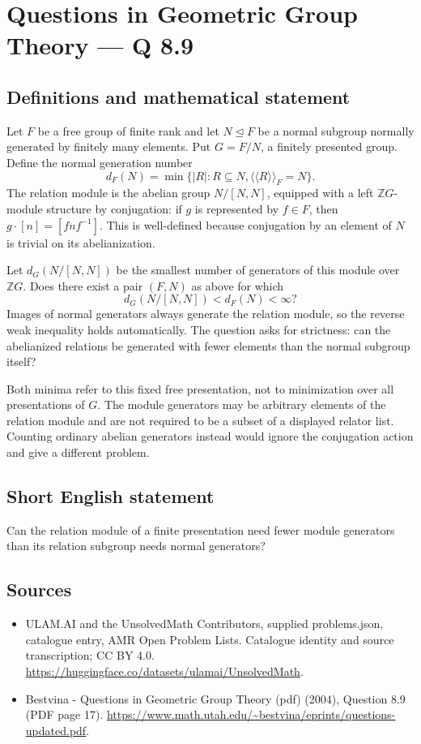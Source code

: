 \documentclass[11pt,a4paper]{article}
\begin{document}
\section*{Questions in Geometric Group Theory — Q 8.9}\label{statement}

\subsection{Definitions and mathematical statement}
Let $F$ be a free group of finite rank and let $N\trianglelefteq F$ be a normal subgroup normally generated by finitely many elements. Put $G=F/N$, a finitely presented group. Define the normal generation number
\[
 d_F(N)=\min\{|R|:R\subseteq N,
                    \langle\!\langle R\rangle\!\rangle_F=N\}.
\]
The relation module is the abelian group $N/[N,N]$, equipped with a left $\mathbb ZG$-module structure by conjugation: if $g$ is represented by $f\in F$, then $g\cdot[n]=[fnf^{-1}]$. This is well-defined because conjugation by an element of $N$ is trivial on its abelianization.

Let $d_G(N/[N,N])$ be the smallest number of generators of this module over $\mathbb ZG$. Does there exist a pair $(F,N)$ as above for which
\[
 d_G(N/[N,N])<d_F(N)<\infty?
\]
Images of normal generators always generate the relation module, so the reverse weak inequality holds automatically. The question asks for strictness: can the abelianized relations be generated with fewer elements than the normal subgroup itself?

Both minima refer to this fixed free presentation, not to minimization over all presentations of $G$. The module generators may be arbitrary elements of the relation module and are not required to be a subset of a displayed relator list. Counting ordinary abelian generators instead would ignore the conjugation action and give a different problem.
\subsection{Short English statement}
Can the relation module of a finite presentation need fewer module generators than its relation subgroup needs normal generators?
\subsection{Sources}
\begin{itemize}
\item[S1] ULAM.AI and the UnsolvedMath Contributors, supplied problems.json, catalogue entry, AMR Open Problem Lists. Catalogue identity and source transcription; CC BY 4.0.
\url{https://huggingface.co/datasets/ulamai/UnsolvedMath}.
\item[S2] Bestvina - Questions in Geometric Group Theory (pdf) (2004), Question 8.9 (PDF page 17). 
\url{https://www.math.utah.edu/~bestvina/eprints/questions-updated.pdf}.
\end{itemize}
\end{document}
